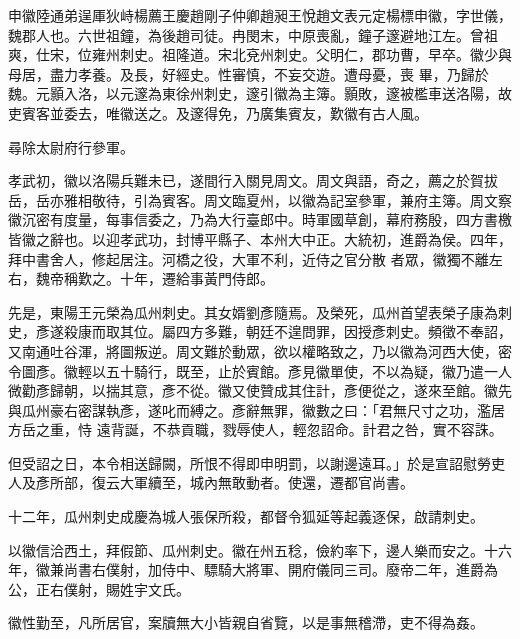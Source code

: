 
\begin{pinyinscope}

 申徽陸通弟逞厙狄峙楊薦王慶趙剛子仲卿趙昶王悅趙文表元定楊標申徽，字世儀，魏郡人也。六世祖鐘，為後趙司徒。冉閔末，中原喪亂，鐘子邃避地江左。曾祖爽，仕宋，位雍州刺史。祖隆道。宋北兗州刺史。父明仁，郡功曹，早卒。徽少與母居，盡力孝養。及長，好經史。性審慎，不妄交遊。遭母憂，喪
 畢，乃歸於魏。元顥入洛，以元邃為東徐州刺史，邃引徽為主簿。顥敗，邃被檻車送洛陽，故吏賓客並委去，唯徽送之。及邃得免，乃廣集賓友，歎徽有古人風。



 尋除太尉府行參軍。



 孝武初，徽以洛陽兵難未已，遂間行入關見周文。周文與語，奇之，薦之於賀拔岳，岳亦雅相敬待，引為賓客。周文臨夏州，以徽為記室參軍，兼府主簿。周文察徽沉密有度量，每事信委之，乃為大行臺郎中。時軍國草創，幕府務殷，四方書檄皆徽之辭也。以迎孝武功，封博平縣子、本州大中正。大統初，進爵為侯。四年，拜中書舍人，修起居注。河橋之役，大軍不利，近侍之官分散
 者眾，徽獨不離左右，魏帝稱歎之。十年，遷給事黃門侍郎。



 先是，東陽王元榮為瓜州刺史。其女婿劉彥隨焉。及榮死，瓜州首望表榮子康為刺史，彥遂殺康而取其位。屬四方多難，朝廷不遑問罪，因授彥刺史。頻徵不奉詔，又南通吐谷渾，將圖叛逆。周文難於動眾，欲以權略致之，乃以徽為河西大使，密令圖彥。徽輕以五十騎行，既至，止於賓館。彥見徽單使，不以為疑，徽乃遣一人微勸彥歸朝，以揣其意，彥不從。徽又使贊成其住計，彥便從之，遂來至館。徽先與瓜州豪右密謀執彥，遂叱而縛之。彥辭無罪，徽數之曰：「君無尺寸之功，濫居方岳之重，恃
 遠背誕，不恭貢職，戮辱使人，輕忽詔命。計君之咎，實不容誅。



 但受詔之日，本令相送歸闕，所恨不得即申明罰，以謝邊遠耳。」於是宣詔慰勞吏人及彥所部，復云大軍續至，城內無敢動者。使還，遷都官尚書。



 十二年，瓜州刺史成慶為城人張保所殺，都督令狐延等起義逐保，啟請刺史。



 以徽信洽西土，拜假節、瓜州刺史。徽在州五稔，儉約率下，邊人樂而安之。十六年，徽兼尚書右僕射，加侍中、驃騎大將軍、開府儀同三司。廢帝二年，進爵為公，正右僕射，賜姓宇文氏。



 徽性勤至，凡所居官，案牘無大小皆親自省覽，以是事無稽滯，吏不得為姦。




\end{pinyinscope}

